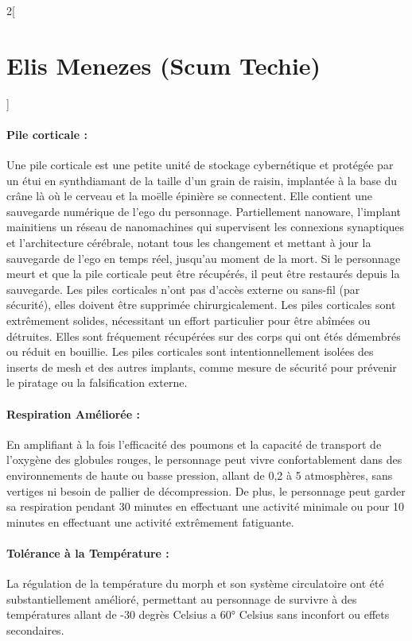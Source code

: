 \documentclass[a4paper,9pt]{article}
\begin{document}
\begin{multicols}{2}[\section*{Elis Menezes (Scum Techie)}]
   \paragraph{Pile corticale :}
   Une pile corticale est une petite unité de stockage cybernétique et protégée
   par un étui en synthdiamant de la taille d'un grain de raisin, implantée à la
   base du crâne là où le cerveau et la moëlle épinière se connectent. Elle
   contient une sauvegarde numérique de l'ego du personnage. Partiellement
   nanoware, l'implant mainitiens un réseau de nanomachines qui supervisent
   les connexions synaptiques et l'architecture cérébrale, notant tous les
   changement et mettant à jour la sauvegarde de l'ego en temps réel, jusqu'au
   moment de la mort. Si le personnage meurt et que la pile corticale peut être
   récupérés, il peut être restaurés depuis la sauvegarde. Les piles corticales
   n'ont pas d'accès externe ou sans-fil (par sécurité), elles doivent être
   supprimée chirurgicalement. Les piles corticales sont extrêmement solides,
   nécessitant un effort particulier pour être abîmées ou détruites. Elles sont
   fréquement récupérées sur des corps qui ont étés démembrés ou réduit en
   bouillie. Les piles corticales sont intentionnellement isolées des inserts de
   mesh et des autres implants, comme mesure de sécurité pour prévenir le piratage
   ou la falsification externe.

   \paragraph{Respiration Améliorée :} En amplifiant à la fois l'efficacité des
   poumons et la capacité de transport de l'oxygène des globules rouges, le
   personnage peut vivre confortablement dans des environnements de haute ou
   basse pression, allant de 0,2 à 5 atmosphères, sans vertiges ni besoin de
   pallier de décompression. De plus, le personnage peut garder sa respiration
   pendant 30 minutes en effectuant une activité minimale ou pour 10 minutes en
   effectuant une activité extrêmement fatiguante.

   \paragraph{Tolérance à la Température :} La régulation de la température du morph
   et son système circulatoire ont été substantiellement amélioré, permettant au
   personnage de survivre à des températures allant de -30 degrès Celsius a 60°
   Celsius sans inconfort ou effets secondaires.


\end{multicols}
\end{document}

